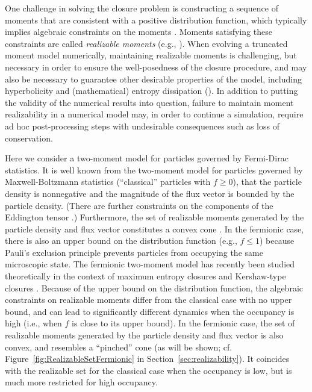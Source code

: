 One challenge in solving the closure problem is constructing a sequence of moments that are consistent with a positive distribution function, which typically implies algebraic constraints on the moments \cite{kershaw_1976,levermore_1984}.  
Moments satisfying these constraints are called \emph{realizable moments} (e.g., \cite{levermore_1996}).  
When evolving a truncated moment model numerically, maintaining realizable moments is challenging, but necessary in order to ensure the well-posedness of the closure procedure, and may also be necessary to guarantee other desirable properties of the model, including hyperbolicity and (mathematical) entropy dissipation ().  
In addition to putting the validity of the numerical results into question, failure to maintain moment realizability in a numerical model may, in order to continue a simulation, require ad hoc post-processing steps with undesirable consequences such as loss of conservation.  

Here we consider a two-moment model for particles governed by Fermi-Dirac statistics.  
It is well known from the two-moment model for particles governed by Maxwell-Boltzmann statistics (``classical'' particles with $f\ge0$), that the particle density is nonnegative and the magnitude of the flux vector is bounded by the particle density.  
(There are further constraints on the components of the Eddington tensor \cite{levermore_1984}.)  
Furthermore, the set of realizable moments generated by the particle density and flux vector constitutes a convex cone \cite{olbrant_etal_2012}.  
In the fermionic case, there is also an upper bound on the distribution function (e.g., $f\le1$) because Pauli's exclusion principle prevents particles from occupying the same microscopic state.  
The fermionic two-moment model has recently been studied theoretically in the context of maximum entropy closures \cite{lareckiBanach_2011,banachLarecki_2013,banachLarecki_2017b} and Kershaw-type closures \cite{banachLarecki_2017a}.  
Because of the upper bound on the distribution function, the algebraic constraints on realizable moments differ from the classical case with no upper bound, and can lead to significantly different dynamics when the occupancy is high (i.e., when $f$ is close to its upper bound).  
In the fermionic case, the set of realizable moments generated by the particle density and flux vector is also convex, and resembles a ``pinched'' cone (as will be shown; cf. Figure~\ref{fig:RealizableSetFermionic} in Section~\ref{sec:realizability}).  
It coincides with the realizable set for the classical case when the occupancy is low, but is much more restricted for high occupancy.  

